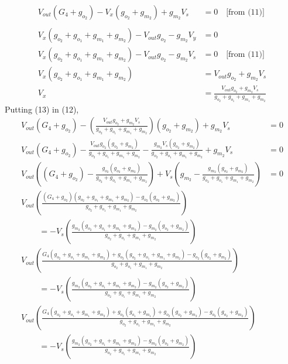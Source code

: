 \begin{enumerate}
\begin{align*}
      V_{out}(G_4 + g_{o_2}) - V_{x}(g_{o_2} + g_{m_2}) + g_{m_2}V_{s} &= 0 \quad \text{[from (11)]} \tag{12} \\
      \\
      V_{x}(g_{o_2} + g_{o_1} + g_{m_1} + g_{m_2}) - V_{out}g_{o_2} - g_{m_2}V_{y} &= 0 \\
      V_{x}(g_{o_2} + g_{o_1} + g_{m_1} + g_{m_2}) - V_{out}g_{o_2} - g_{m_2}V_{s} &= 0 \quad \text{[from (11)]} \\
      V_{x}(g_{o_2} + g_{o_1} + g_{m_1} + g_{m_2}) &= V_{out}g_{o_2} + g_{m_2}V_{s} \\
      V_{x} &= \frac{V_{out}g_{o_2} + g_{m_2}V_{s}}{g_{o_2} + g_{o_1} + g_{m_1} + g_{m_2}} \tag{13}
    \end{align*}
    Putting (13) in (12),
    \begin{align*}
      V_{out}(G_4 + g_{o_2}) - \left(\frac{V_{out}g_{o_2} + g_{m_2}V_{s}}{g_{o_2} + g_{o_1} + g_{m_1} + g_{m_2}}\right)(g_{o_2} + g_{m_2}) + g_{m_2}V_{s} &= 0 \\
      V_{out}(G_4 + g_{o_2}) - \frac{V_{out}g_{o_2}(g_{o_2} + g_{m_2})}{g_{o_2} + g_{o_1} + g_{m_1} + g_{m_2}} - \frac{g_{m_2}V_{s}(g_{o_2} + g_{m_2})}{g_{o_2} + g_{o_1} + g_{m_1} + g_{m_2}} + g_{m_2}V_{s} &= 0 \\
      V_{out}\left((G_4 + g_{o_2}) - \frac{g_{o_2}(g_{o_2} + g_{m_2})}{g_{o_2} + g_{o_1} + g_{m_1} + g_{m_2}}\right) + V_{s}\left(g_{m_2} - \frac{g_{m_2}(g_{o_2} + g_{m_2})}{g_{o_2} + g_{o_1} + g_{m_1} + g_{m_2}}\right) &= 0 \\
      V_{out}\left(\frac{(G_4 + g_{o_2})(g_{o_2} + g_{o_1} + g_{m_1} + g_{m_2}) - g_{o_2}(g_{o_2} + g_{m_2})}{g_{o_2} + g_{o_1} + g_{m_1} + g_{m_2}}\right) \\ \qquad \, = -V_{s}\left(\frac{g_{m_2}(g_{o_2} + g_{o_1} + g_{m_1} + g_{m_2}) - g_{m_2}(g_{o_2} + g_{m_2})}{g_{o_2} + g_{o_1} + g_{m_1} + g_{m_2}}\right) \\
      V_{out}\left(\frac{G_4(g_{o_2} + g_{o_1} + g_{m_1} + g_{m_2}) + g_{o_2}(g_{o_2} + g_{o_1} + g_{m_1} + g_{m_2}) - g_{o_2}(g_{o_2} + g_{m_2})}{g_{o_2} + g_{o_1} + g_{m_1} + g_{m_2}}\right) \\ \qquad \, = -V_{s}\left(\frac{g_{m_2}(g_{o_2} + g_{o_1} + g_{m_1} + g_{m_2}) - g_{m_2}(g_{o_2} + g_{m_2})}{g_{o_2} + g_{o_1} + g_{m_1} + g_{m_2}}\right) \\
      V_{out}\left(\frac{G_4(g_{o_2} + g_{o_1} + g_{m_1} + g_{m_2}) + g_{o_2}(g_{o_1} + g_{m_1}) + g_{o_2}(g_{o_2} + g_{m_2}) - g_{o_2}(g_{o_2} + g_{m_2})}{g_{o_2} + g_{o_1} + g_{m_1} + g_{m_2}}\right) \\ \qquad \, = -V_{s}\left(\frac{g_{m_2}(g_{o_2} + g_{o_1} + g_{m_1} + g_{m_2}) - g_{m_2}(g_{o_2} + g_{m_2})}{g_{o_2} + g_{o_1} + g_{m_1} + g_{m_2}}\right) \\

\end{align*}
\end{enumerate}
